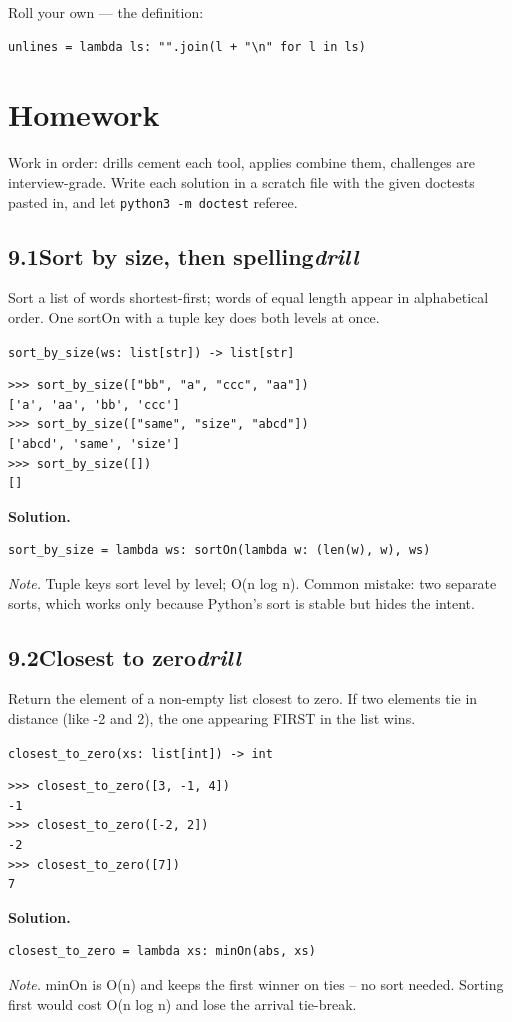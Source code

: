 \documentclass[10pt,letterpaper]{book}
\begin{document}
Roll your own --- the definition:

\begin{lstlisting}[style=ex]
unlines = lambda ls: "".join(l + "\n" for l in ls)
\end{lstlisting}
\section{Homework}
Work in order: drills cement each tool, applies combine them,
challenges are interview-grade. Write each solution in a scratch file with
the given doctests pasted in, and let \texttt{python3 -m doctest} referee.
\subsection*{9.1\quad Sort by size, then spelling\hfill\textnormal{\textit{drill}}}
Sort a list of words shortest-first; words of equal length appear in alphabetical order. One sortOn with a tuple key does both levels at once.

\noindent\texttt{sort\_by\_size(ws: list[str]) -> list[str]}
\begin{lstlisting}[style=ex]
>>> sort_by_size(["bb", "a", "ccc", "aa"])
['a', 'aa', 'bb', 'ccc']
>>> sort_by_size(["same", "size", "abcd"])
['abcd', 'same', 'size']
>>> sort_by_size([])
[]
\end{lstlisting}
\noindent\textbf{Solution.}
\begin{lstlisting}[style=code]
sort_by_size = lambda ws: sortOn(lambda w: (len(w), w), ws)
\end{lstlisting}
\noindent\textit{Note.} Tuple keys sort level by level; O(n log n). Common mistake: two separate sorts, which works only because Python's sort is stable but hides the intent.

\subsection*{9.2\quad Closest to zero\hfill\textnormal{\textit{drill}}}
Return the element of a non-empty list closest to zero. If two elements tie in distance (like -2 and 2), the one appearing FIRST in the list wins.

\noindent\texttt{closest\_to\_zero(xs: list[int]) -> int}
\begin{lstlisting}[style=ex]
>>> closest_to_zero([3, -1, 4])
-1
>>> closest_to_zero([-2, 2])
-2
>>> closest_to_zero([7])
7
\end{lstlisting}
\noindent\textbf{Solution.}
\begin{lstlisting}[style=code]
closest_to_zero = lambda xs: minOn(abs, xs)
\end{lstlisting}
\noindent\textit{Note.} minOn is O(n) and keeps the first winner on ties -- no sort needed. Sorting first would cost O(n log n) and lose the arrival tie-break.
\end{document}
